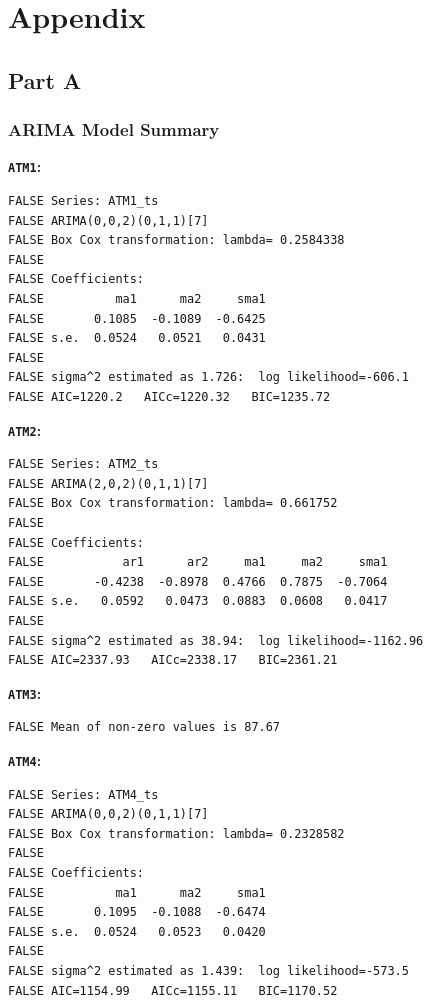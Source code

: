 \documentclass[openany]{book}
\begin{document}
\hypertarget{Appendix}{%
\chapter*{Appendix}\label{Appendix}}

\hypertarget{Part-A}{%
\section*{Part A}\label{Part-A}}

\hypertarget{Part-A-arima}{%
\subsection*{ARIMA Model Summary}\label{Part-A-arima}}

\textbf{\texttt{ATM1}:}

\begin{verbatim}
FALSE Series: ATM1_ts 
FALSE ARIMA(0,0,2)(0,1,1)[7] 
FALSE Box Cox transformation: lambda= 0.2584338 
FALSE 
FALSE Coefficients:
FALSE          ma1      ma2     sma1
FALSE       0.1085  -0.1089  -0.6425
FALSE s.e.  0.0524   0.0521   0.0431
FALSE 
FALSE sigma^2 estimated as 1.726:  log likelihood=-606.1
FALSE AIC=1220.2   AICc=1220.32   BIC=1235.72
\end{verbatim}

\textbf{\texttt{ATM2}:}

\begin{verbatim}
FALSE Series: ATM2_ts 
FALSE ARIMA(2,0,2)(0,1,1)[7] 
FALSE Box Cox transformation: lambda= 0.661752 
FALSE 
FALSE Coefficients:
FALSE           ar1      ar2     ma1     ma2     sma1
FALSE       -0.4238  -0.8978  0.4766  0.7875  -0.7064
FALSE s.e.   0.0592   0.0473  0.0883  0.0608   0.0417
FALSE 
FALSE sigma^2 estimated as 38.94:  log likelihood=-1162.96
FALSE AIC=2337.93   AICc=2338.17   BIC=2361.21
\end{verbatim}

\textbf{\texttt{ATM3}:}

\begin{verbatim}
FALSE Mean of non-zero values is 87.67
\end{verbatim}

\textbf{\texttt{ATM4}:}

\begin{verbatim}
FALSE Series: ATM4_ts 
FALSE ARIMA(0,0,2)(0,1,1)[7] 
FALSE Box Cox transformation: lambda= 0.2328582 
FALSE 
FALSE Coefficients:
FALSE          ma1      ma2     sma1
FALSE       0.1095  -0.1088  -0.6474
FALSE s.e.  0.0524   0.0523   0.0420
FALSE 
FALSE sigma^2 estimated as 1.439:  log likelihood=-573.5
FALSE AIC=1154.99   AICc=1155.11   BIC=1170.52
\end{verbatim}
\end{document}
